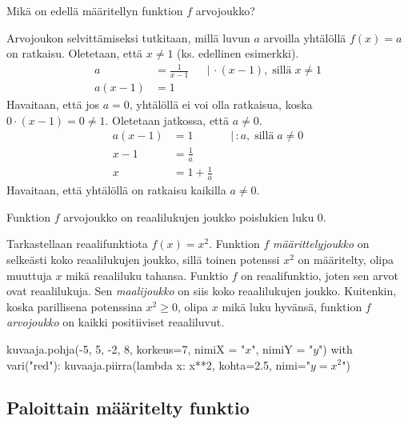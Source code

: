 \begin{esimerkki}
	Mikä on edellä määritellyn funktion $f$ arvojoukko?
	\begin{esimratk}
		Arvojoukon selvittämiseksi tutkitaan, millä luvun $a$ arvoilla
		yhtälöllä $f(x) = a$ on ratkaisu. Oletetaan, että $x \neq 1$ (ks. edellinen esimerkki).
		\begin{align*}
			a &= \frac{1}{x-1} & &| \, \cdot (x-1), \; \text{sillä} \; x \neq 1 \\
			a(x-1) &= 1
		\end{align*}
		Havaitaan, että jos $a = 0$, yhtälöllä ei voi olla ratkaisua, koska $0 \cdot (x-1) = 0 \neq 1$.
		Oletetaan jatkossa, että $a \neq 0$.
		\begin{align*}
			a(x-1) &= 1 & &| \, : a, \; \text{sillä} \; a \neq 0 \\
			x-1 &= \frac{1}{a} \\
			x &= 1+\frac{1}{a}
		\end{align*}
		Havaitaan, että yhtälöllä on ratkaisu kaikilla $a \neq 0$.
	\end{esimratk}
	\begin{esimvast}
		Funktion $f$ arvojoukko on reaalilukujen joukko poislukien luku $0$.
	\end{esimvast}
\end{esimerkki}

\begin{esimerkki}
	Tarkastellaan reaalifunktiota $f(x)=x^2$. Funktion $f$ \textit{määrittelyjoukko} on selkeästi koko reaalilukujen joukko, sillä toinen potenssi $x^2$ on määritelty, olipa muuttuja $x$ mikä reaaliluku tahansa. Funktio $f$ on reaalifunktio, joten sen arvot ovat reaalilukuja. Sen \textit{maalijoukko} on siis koko reaalilukujen joukko. Kuitenkin, koska parillisena potenssina $x^{2}\geq0$, olipa $x$ mikä luku hyvänsä, funktion $f$ \textit{arvojoukko} on kaikki positiiviset reaaliluvut.
	
\begin{center}
\begin{kuva}
	kuvaaja.pohja(-5, 5, -2, 8, korkeus=7, nimiX = "$x$", nimiY = "$y$")
	with vari("red"): kuvaaja.piirra(lambda x: x**2, kohta=2.5, nimi="$y=x^2$")
\end{kuva}
\end{center}
	
	
\end{esimerkki}
	
\subsection*{Paloittain määritelty funktio}


